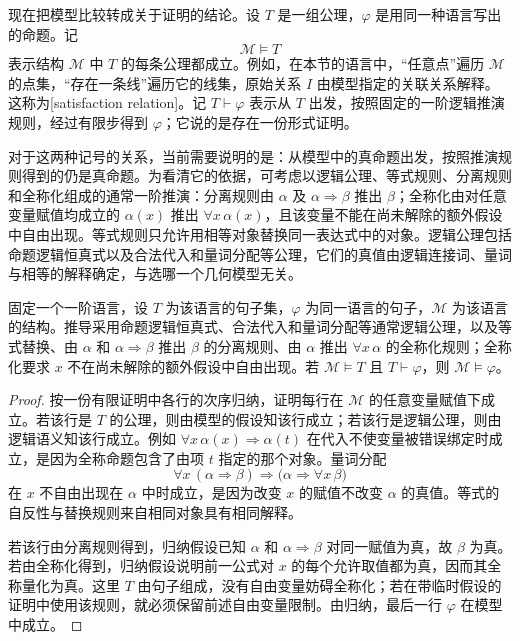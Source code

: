 现在把模型比较转成关于证明的结论。设 \(T\) 是一组公理，\(\varphi\) 是用同一种语言写出的命题。记
\[
	\mathcal M\models T
\]
表示结构 \(\mathcal M\) 中 \(T\) 的每条公理都成立。例如，在本节的语言中，“任意点”遍历 \(\mathcal M\) 的点集，“存在一条线”遍历它的线集，原始关系 \(I\) 由模型指定的关联关系解释。这称为[satisfaction relation]。记 \(T\vdash\varphi\) 表示从 \(T\) 出发，按照固定的一阶逻辑推演规则，经过有限步得到 \(\varphi\)；它说的是存在一份形式证明。

\ProseParagraphBreak

对于这两种记号的关系，当前需要说明的是：从模型中的真命题出发，按照推演规则得到的仍是真命题。为看清它的依据，可考虑以逻辑公理、等式规则、分离规则和全称化组成的通常一阶推演：分离规则由 \(\alpha\) 及 \(\alpha\Rightarrow\beta\) 推出 \(\beta\)；全称化由对任意变量赋值均成立的 \(\alpha(x)\) 推出 \(\forall x\,\alpha(x)\)，且该变量不能在尚未解除的额外假设中自由出现。等式规则只允许用相等对象替换同一表达式中的对象。逻辑公理包括命题逻辑恒真式以及合法代入和量词分配等公理，它们的真值由逻辑连接词、量词与相等的解释确定，与选哪一个几何模型无关。

\begin{proposition}
	\label{g1:prop:geometric-soundness}
	固定一个一阶语言，设 \(T\) 为该语言的句子集，\(\varphi\) 为同一语言的句子，\(\mathcal M\) 为该语言的结构。推导采用命题逻辑恒真式、合法代入和量词分配等通常逻辑公理，以及等式替换、由 \(\alpha\) 和 \(\alpha\Rightarrow\beta\) 推出 \(\beta\) 的分离规则、由 \(\alpha\) 推出 \(\forall x\,\alpha\) 的全称化规则；全称化要求 \(x\) 不在尚未解除的额外假设中自由出现。若 \(\mathcal M\models T\) 且 \(T\vdash\varphi\)，则 \(\mathcal M\models\varphi\)。
\end{proposition}
\begin{proof}
	按一份有限证明中各行的次序归纳，证明每行在 \(\mathcal M\) 的任意变量赋值下成立。若该行是 \(T\) 的公理，则由模型的假设知该行成立；若该行是逻辑公理，则由逻辑语义知该行成立。例如 \(\forall x\,\alpha(x)\Rightarrow\alpha(t)\) 在代入不使变量被错误绑定时成立，是因为全称命题包含了由项 \(t\) 指定的那个对象。量词分配
	\[
		\forall x\,(\alpha\Rightarrow\beta)
		\Rightarrow\bigl(\alpha\Rightarrow\forall x\,\beta\bigr)
	\]
	在 \(x\) 不自由出现在 \(\alpha\) 中时成立，是因为改变 \(x\) 的赋值不改变 \(\alpha\) 的真值。等式的自反性与替换规则来自相同对象具有相同解释。

	若该行由分离规则得到，归纳假设已知 \(\alpha\) 和 \(\alpha\Rightarrow\beta\) 对同一赋值为真，故 \(\beta\) 为真。若由全称化得到，归纳假设说明前一公式对 \(x\) 的每个允许取值都为真，因而其全称量化为真。这里 \(T\) 由句子组成，没有自由变量妨碍全称化；若在带临时假设的证明中使用该规则，就必须保留前述自由变量限制。由归纳，最后一行 \(\varphi\) 在模型中成立。
\end{proof}

